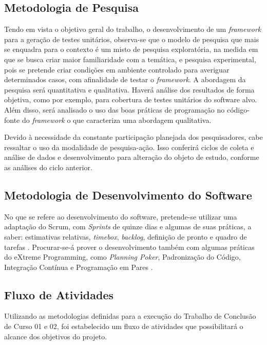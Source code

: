   \subsection{Metodologia de Pesquisa} \label{Metodologia de Pesquisa}
  Tendo em vista o objetivo geral do trabalho, o desenvolvimento de um \textit{framework} para a geração de testes unitários, observa-se que o modelo de pesquisa que mais se enquadra para o contexto é um misto de pesquisa exploratória, na medida em que se busca criar maior familiaridade com a temática, e pesquisa experimental, pois se pretende criar condições em ambiente controlado para averiguar determinados casos, com afinalidade de testar o \textit{framework}. A abordagem da pesquisa será quantitativa e qualitativa. Haverá análise dos resultados de forma objetiva, como por exemplo, para cobertura de testes unitários do software alvo. Além disso, será analisado o uso das boas práticas de programação no código-fonte do \textit{framework} o que caracteriza uma abordagem qualitativa.
  \par
  \indent Devido à necessidade da constante participação planejada dos pesquisadores, cabe ressaltar o uso da modalidade de pesquisa-ação. Isso conferirá ciclos de coleta e análise de dados e desenvolvimento para alteração do objeto de estudo, conforme as análises do ciclo anterior.

 \subsection{Metodologia de Desenvolvimento do Software} \label{Metodologia de Desenvolvimento do Software}
  No que se refere ao desenvolvimento do software, pretende-se utilizar uma adaptação do Scrum, com \textit{Sprints} de quinze dias e algumas de suas práticas, a saber: estimativas relativas, \textit{timebox}, \textit{backlog}, definição de pronto e quadro de tarefas \cite{scrum2014}. Procurar-se-á prover o desenvolvimento também com algumas práticas do eXtreme Programming, como \textit{Planning Poker}, Padronização do Código, Integração Contínua e Programação em Pares \cite{wells2009}.
 
 \subsection{Fluxo de Atividades}
 	
 	Utilizando as metodologias definidas para a execução do Trabalho de Conclusão de Curso 01 e 02, foi estabelecido um fluxo de atividades que possibilitará o alcance dos objetivos do projeto.
 	
